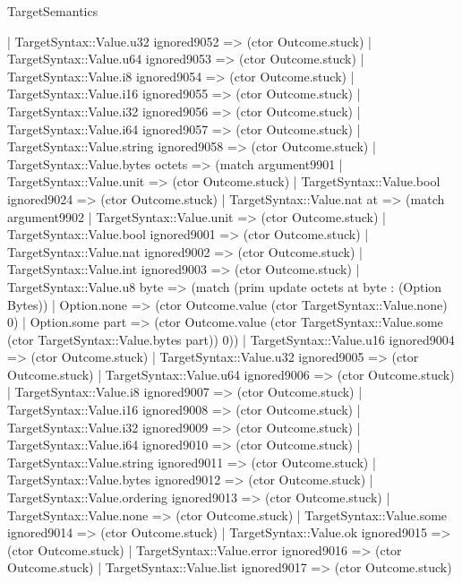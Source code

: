 \begin{lexlean}{TargetSemantics}
\begin{semanticmodule}
{              | TargetSyntax::Value.u32 ignored9052 => (ctor Outcome.stuck)
              | TargetSyntax::Value.u64 ignored9053 => (ctor Outcome.stuck)
              | TargetSyntax::Value.i8 ignored9054 => (ctor Outcome.stuck)
              | TargetSyntax::Value.i16 ignored9055 => (ctor Outcome.stuck)
              | TargetSyntax::Value.i32 ignored9056 => (ctor Outcome.stuck)
              | TargetSyntax::Value.i64 ignored9057 => (ctor Outcome.stuck)
              | TargetSyntax::Value.string ignored9058 => (ctor Outcome.stuck)
              | TargetSyntax::Value.bytes octets => (match argument9901
                | TargetSyntax::Value.unit => (ctor Outcome.stuck)
                | TargetSyntax::Value.bool ignored9024 => (ctor Outcome.stuck)
                | TargetSyntax::Value.nat at => (match argument9902
                  | TargetSyntax::Value.unit => (ctor Outcome.stuck)
                  | TargetSyntax::Value.bool ignored9001 => (ctor Outcome.stuck)
                  | TargetSyntax::Value.nat ignored9002 => (ctor Outcome.stuck)
                  | TargetSyntax::Value.int ignored9003 => (ctor Outcome.stuck)
                  | TargetSyntax::Value.u8 byte => (match (prim update octets at byte : (Option Bytes))
                    | Option.none => (ctor Outcome.value (ctor TargetSyntax::Value.none) 0)
                    | Option.some part => (ctor Outcome.value (ctor TargetSyntax::Value.some (ctor TargetSyntax::Value.bytes part)) 0))
                  | TargetSyntax::Value.u16 ignored9004 => (ctor Outcome.stuck)
                  | TargetSyntax::Value.u32 ignored9005 => (ctor Outcome.stuck)
                  | TargetSyntax::Value.u64 ignored9006 => (ctor Outcome.stuck)
                  | TargetSyntax::Value.i8 ignored9007 => (ctor Outcome.stuck)
                  | TargetSyntax::Value.i16 ignored9008 => (ctor Outcome.stuck)
                  | TargetSyntax::Value.i32 ignored9009 => (ctor Outcome.stuck)
                  | TargetSyntax::Value.i64 ignored9010 => (ctor Outcome.stuck)
                  | TargetSyntax::Value.string ignored9011 => (ctor Outcome.stuck)
                  | TargetSyntax::Value.bytes ignored9012 => (ctor Outcome.stuck)
                  | TargetSyntax::Value.ordering ignored9013 => (ctor Outcome.stuck)
                  | TargetSyntax::Value.none => (ctor Outcome.stuck)
                  | TargetSyntax::Value.some ignored9014 => (ctor Outcome.stuck)
                  | TargetSyntax::Value.ok ignored9015 => (ctor Outcome.stuck)
                  | TargetSyntax::Value.error ignored9016 => (ctor Outcome.stuck)
                  | TargetSyntax::Value.list ignored9017 => (ctor Outcome.stuck)
}
\end{semanticmodule}
\end{lexlean}
